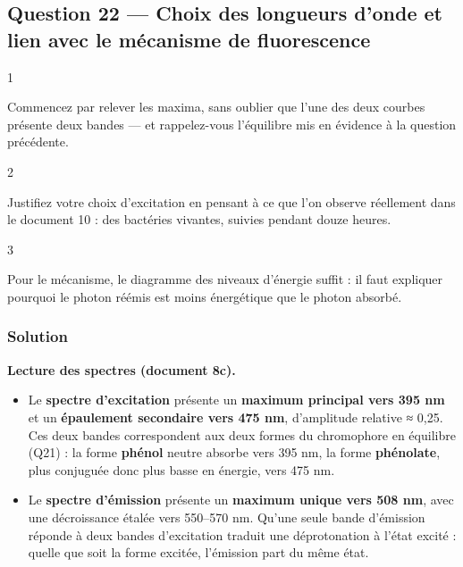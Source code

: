 \documentclass[11pt,a4paper]{article}
\providecommand{\tightlist}{\setlength{\itemsep}{0pt}\setlength{\parskip}{0pt}}
\begin{document}
\hypertarget{question-22-choix-des-longueurs-donde-et-lien-avec-le-muxe9canisme-de-fluorescence}{%
\subsection{Question 22 --- Choix des longueurs d'onde et lien avec le mécanisme de fluorescence}\label{question-22-choix-des-longueurs-donde-et-lien-avec-le-muxe9canisme-de-fluorescence}}

\begin{indication}{1}

Commencez par relever les maxima, sans oublier que l'une des deux courbes présente deux bandes --- et rappelez-vous l'équilibre mis en évidence à la question précédente.

\end{indication}

\begin{indication}{2}

Justifiez votre choix d'excitation en pensant à ce que l'on observe réellement dans le document 10 : des bactéries vivantes, suivies pendant douze heures.

\end{indication}

\begin{indication}{3}

Pour le mécanisme, le diagramme des niveaux d'énergie suffit : il faut expliquer pourquoi le photon réémis est moins énergétique que le photon absorbé.

\end{indication}

\hypertarget{solution-21}{%
\subsubsection{Solution}\label{solution-21}}

\textbf{Lecture des spectres (document 8c).}

\begin{itemize}
\tightlist
\item
  Le \textbf{spectre d'excitation} présente un \textbf{maximum principal vers 395 nm} et un \textbf{épaulement secondaire vers 475 nm}, d'amplitude relative ≈ 0,25. Ces deux bandes correspondent aux deux formes du chromophore en équilibre (Q21) : la forme \textbf{phénol} neutre absorbe vers 395 nm, la forme \textbf{phénolate}, plus conjuguée donc plus basse en énergie, vers 475 nm.
\item
  Le \textbf{spectre d'émission} présente un \textbf{maximum unique vers 508 nm}, avec une décroissance étalée vers 550--570 nm. Qu'une seule bande d'émission réponde à deux bandes d'excitation traduit une déprotonation à l'état excité : quelle que soit la forme excitée, l'émission part du même état.
\end{itemize}
\end{document}
